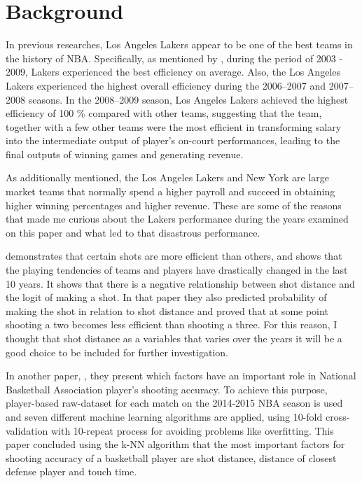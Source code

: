 \documentclass[
  11pt,
]{article}
\begin{document}
\hypertarget{sec:background}{%
\section{Background}\label{sec:background}}

In previous researches, Los Angeles Lakers appear to be one of the best teams in the history of NBA. Specifically, as mentioned by \citep{yang2014measuring}, during the period of 2003 - 2009, Lakers experienced the best efficiency on average. Also, the Los Angeles Lakers experienced the highest overall efficiency during the 2006--2007 and 2007--2008 seasons. In the 2008--2009 season, Los Angeles Lakers achieved the highest efficiency of 100 \% compared with other teams, suggesting that the team, together with a few other teams were the most efficient in transforming salary into the intermediate output of player's on-court performances, leading to the final outputs of winning games and generating revenue.

As additionally mentioned, the Los Angeles Lakers and New York are large market teams that normally spend a higher payroll and succeed in obtaining higher winning percentages and higher revenue. These are some of the reasons that made me curious about the Lakers performance during the years examined on this paper and what led to that disastrous performance.

\citep{da2020statistical} demonstrates that certain shots are more efficient than others, and shows that the playing tendencies of teams and players have drastically changed in the last 10 years. It shows that there is a negative relationship between shot distance and the logit of making a shot. In that paper they also predicted probability of making the shot in relation to shot distance and proved that at some point shooting a two becomes less efficient than shooting a three. For this reason, I thought that shot distance as a variables that varies over the years it will be a good choice to be included for further investigation.

In another paper, \citep{depren10effectiveness}, they present which factors have an important role in National Basketball Association player's shooting accuracy. To achieve this purpose, player-based raw-dataset for each match on the 2014-2015 NBA season is used and seven different machine learning algorithms are applied, using 10-fold cross-validation with 10-repeat process for avoiding problems like overfitting.
This paper concluded using the k-NN algorithm that the most important factors for shooting accuracy of a basketball player are shot distance, distance of closest defense player and touch time.
\end{document}
